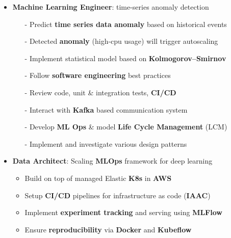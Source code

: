 \documentclass[10pt,a4paper,ragged2e]{altacv}
\begin{document}
\begin{itemize}
	\item \textbf{Machine Learning Engineer}: time-series anomaly detection
	\vspace{0.3em}
	\begin{itemize}
		\item[-] Predict \textbf{time series data anomaly} based on historical events
		\item[-] Detected \textbf{anomaly} (high-cpu usage) will trigger autoscaling
		\item[-] Implement statistical model based on \textbf{Kolmogorov–Smirnov}
		\item[-] Follow \textbf{software engineering} best practices
		\item[-] Review code, unit \& integration tests, \textbf{CI/CD}
		\item[-] Interact with \textbf{Kafka} based communication system 
		\item[-] Develop \textbf{ML Ops} \& model \textbf{Life Cycle Management} (LCM)
		\item[-] Implement and investigate various design patterns
	\end{itemize}

	\item \textbf{Data Architect}: Scaling \textbf{MLOps} framework for deep learning
	\vspace{0.3em}
	\begin{itemize}
		\item Build on top of managed Elastic \textbf{K8s} in \textbf{AWS}
		\item Setup \textbf{CI/CD} pipelines for infrastructure as code (\textbf{IAAC}) 
		\item Implement \textbf{experiment tracking} and serving using \textbf{MLFlow}
		\item Ensure \textbf{reproducibility} via \textbf{Docker} and \textbf{Kubeflow}
	\end{itemize}
    
	
	
\end{itemize}

\divider
\end{document}
